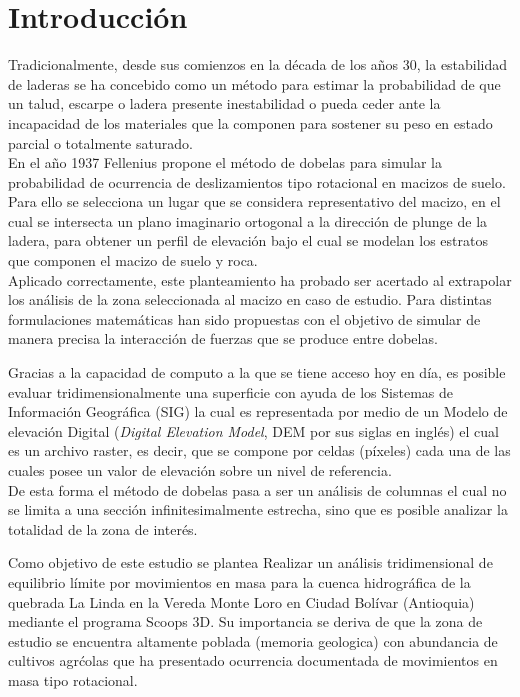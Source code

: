 \chapter{Introducci\'{o}n}
Tradicionalmente, desde sus comienzos en la d\'ecada de los a\~{n}os 30, la estabilidad de laderas se ha concebido como un m\'etodo para estimar la probabilidad de que un talud, escarpe o ladera presente inestabilidad o pueda ceder ante la incapacidad de los materiales que la componen para sostener su peso en estado parcial o totalmente saturado.\\


En el a\~{n}o 1937 Fellenius propone el m\'etodo de dobelas para simular la probabilidad de ocurrencia de deslizamientos tipo rotacional en macizos de suelo. Para ello se selecciona un lugar que se considera representativo del macizo, en el cual se intersecta un plano imaginario ortogonal a la direcci\'on de plunge de la ladera, para obtener un perfil de elevaci\'on bajo el cual se modelan los estratos que componen el macizo de suelo y roca.\\

Aplicado correctamente, este planteamiento ha probado ser acertado al extrapolar los an\'alisis de la zona seleccionada al macizo en caso de estudio. Para distintas formulaciones matem\'aticas han sido propuestas  con el objetivo de simular de manera precisa la interacci\'on de fuerzas que se produce entre dobelas.

Gracias a la capacidad de computo a la que se tiene acceso hoy en d\'ia, es posible evaluar tridimensionalmente una superficie con ayuda de los Sistemas de Informaci\'on Geogr\'afica (SIG) la cual es representada por medio de un Modelo de elevaci\'on Digital (\textit{Digital Elevation Model}, DEM por sus siglas en ingl\'es) el cual es un archivo raster, es decir, que se compone por celdas (p\'ixeles) cada una de las cuales posee un valor de elevaci\'on sobre un nivel de referencia.
\\
De esta forma el m\'etodo de dobelas pasa a ser un an\'alisis de columnas el cual no se limita a una secci\'on infinitesimalmente estrecha, sino que es posible analizar la totalidad de la zona de inter\'es.\par

Como objetivo de este estudio se plantea Realizar un an\'alisis tridimensional de equilibrio l\'imite por movimientos en masa para la cuenca hidrogr\'afica de la quebrada La Linda en la Vereda Monte Loro en Ciudad Bol\'ivar (Antioquia) mediante el programa Scoops 3D.
Su importancia se deriva de que la zona de estudio se encuentra altamente poblada (memoria geologica) con abundancia de cultivos agr\'colas que ha presentado ocurrencia documentada de movimientos en masa tipo rotacional.\\

